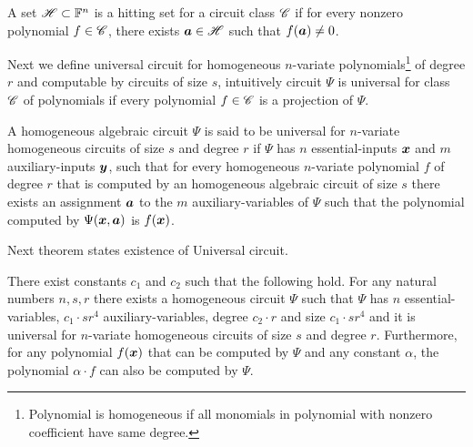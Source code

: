{\begin{definition}
A set $\mathscr{H}\subset\mathbb{F}^n$ is a hitting set for a circuit class $\mathscr{C}$ if for every nonzero polynomial $f\in\mathscr{C}$, there exists $\bm a\in\mathscr{H}$ such that $f(\bm a)\ne0$.
\end{definition}
Next we define universal circuit for homogeneous $n$-variate polynomials\footnote{Polynomial is homogeneous if all monomials in polynomial with nonzero coefficient have same degree.} of degree $r$ and computable by circuits of size $s$, intuitively circuit $\Psi$ is universal for class $\mathscr{C}$ of polynomials if every polynomial $f\in\mathscr{C}$ is a projection of $\Psi$.
\begin{definition}
A homogeneous algebraic circuit $\Psi$ is said to be universal for $n$-variate
homogeneous circuits of size $s$ and degree $r$ if $\Psi$ has $n$ essential-inputs $\bm x$ and $m$ auxiliary-inputs $\bm y$, such that for every homogeneous $n$-variate polynomial $f$ of degree $r$ that is computed by an homogeneous algebraic circuit of size $s$ there exists an assignment $\bm a$ to the $m$ auxiliary-variables of $\Psi$ such that the polynomial computed by $\Psi(\bm x,\bm a)$ is $f(\bm x)$.
\end{definition}
Next theorem states existence of Universal circuit.
\begin{theorem}
There exist constants $c_1$ and $c_2$ such that the following hold. For any
natural numbers $n,s,r$ there exists a homogeneous circuit $\Psi$ such that $\Psi$ has $n$ essential-variables, $c_1\cdot sr^4$ auxiliary-variables, degree $c_2\cdot r$ and size $c_1\cdot sr^4$ and it is universal for $n$-variate homogeneous circuits of size $s$ and degree $r$. Furthermore, for any polynomial $f(\bm x)$ that can be computed by $\Psi$ and any constant $\alpha$,
the polynomial $\alpha\cdot f$ can also be computed by $\Psi$.
\end{theorem}
}